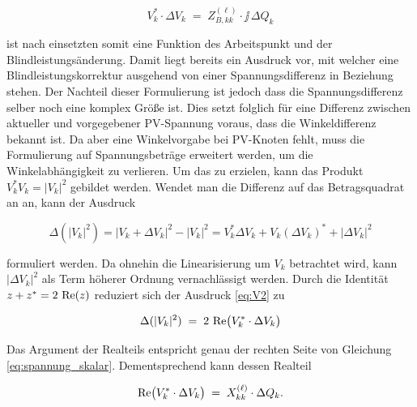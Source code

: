 \begin{equation}
	V_k^* \cdot \Delta V_k \;=\; Z^{(\ell)}_{B,kk}\cdot\jj\,\Delta Q_k
	\label{eq:spannung_skalar2}
\end{equation}

ist nach einsetzten somit eine Funktion des Arbeitspunkt und der Blindleistungsänderung.
Damit liegt bereits ein Ausdruck vor, mit welcher eine Blindleistungskorrektur ausgehend von einer Spannungsdifferenz in Beziehung stehen.
Der Nachteil dieser Formulierung ist jedoch dass die Spannungsdifferenz selber noch eine komplex Größe ist. 
Dies setzt folglich für eine Differenz zwischen aktueller und vorgegebener PV-Spannung voraus, dass die Winkeldifferenz bekannt ist.
Da aber eine Winkelvorgabe bei PV-Knoten fehlt, muss die Formulierung auf Spannungsbeträge erweitert werden, um die Winkelabhängigkeit zu verlieren.
Um das zu erzielen, kann das Produkt 	$V_k^* V_k = |V_k|^2$ gebildet werden.
Wendet man die Differenz auf das Betragsquadrat an an, kann der Ausdruck 

\begin{equation}
    \Delta(|V_k|^2) = |V_k + \Delta V_k|^2 - |V_k|^2
	= V_k^*\Delta V_k + V_k(\Delta V_k)^* + |\Delta V_k|^2
	\label{eq:V2}
\end{equation}

formuliert werden.
Da ohnehin die Linearisierung um $V_k$ betrachtet wird, kann $|\Delta V_k|^2$ als Term höherer Ordnung vernachlässigt werden. Durch die Identität $z + z^* = 2\,\operatorname{Re}(z)$ reduziert sich der Ausdruck \eqref{eq:V2} zu

\begin{equation}
	\Delta(|V_k|^2) \;=\; 2\,\operatorname{Re}\bigl(V_k^*\cdot\Delta V_k\bigr)
	\label{eq:betragsquadrat_identitaet}
\end{equation}

Das Argument der Realteils entspricht genau der rechten Seite von Gleichung \eqref{eq:spannung_skalar}.
Dementsprechend kann dessen Realteil

\begin{equation}
	\operatorname{Re}\bigl(V_k^*\cdot\Delta V_k\bigr) \;=\; X^{(\ell)}_{kk}\cdot\Delta Q_k.
	\label{eq:realteil_skalar}
\end{equation}


